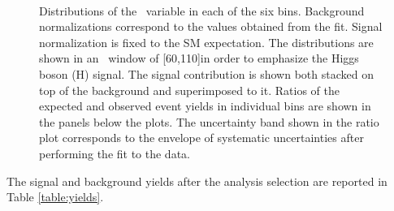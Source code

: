 \begin{figure}[!htbp]
{}
\\
\caption{Distributions of the \mll~variable in each of the six \pth{} bins. Background normalizations correspond to the values obtained from the fit. Signal normalization is fixed to the SM expectation. The distributions are shown in an \mt{}~window of [60,110]\GeV in order to emphasize the Higgs boson (H) signal. The signal contribution is shown both stacked on top of the background and superimposed to it. Ratios of the expected and observed event yields in individual bins are shown in the panels below the plots. The uncertainty band shown in the ratio plot corresponds to the envelope of systematic uncertainties after performing the fit to the data.}\label{fig:mllSignalRegion}
\end{figure}

The signal and background yields after the analysis selection are reported in Table \ref{table:yields}.

